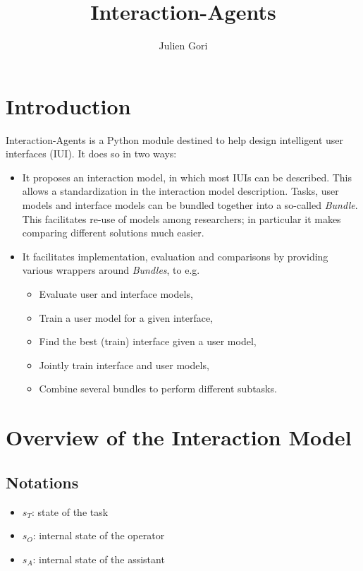 \documentclass[12pt,a4paper]{article}
\title{Interaction-Agents}
\author{Julien Gori}
\begin{document}
\maketitle

\newpage

\tableofcontents

\newpage

\section{Introduction}

Interaction-Agents is a Python module destined to help design intelligent user interfaces (IUI). It does so in two ways:
\begin{itemize}
\item It proposes an interaction model, in which most IUIs can be described. This allows a standardization in the interaction model description. Tasks, user models and interface models can be bundled together into a so-called \emph{Bundle}. This facilitates re-use of models among researchers; in particular it makes comparing different solutions much easier.
\item It facilitates implementation, evaluation and comparisons by providing various wrappers around \emph{Bundles}, to e.g.
	\begin{itemize}
	\item Evaluate user and interface models,
	\item Train a user model for a given interface,
	\item Find the best (train) interface given a user model,
	\item Jointly train interface and user models,
	\item Combine several bundles to perform different subtasks.
	\end{itemize}
\end{itemize}

\section{Overview of the Interaction Model}
\subsection{Notations}
\begin{itemize}
\item $s_T$: state of the task
\item $s_O$: internal state of the operator
\item $s_A$: internal state of the assistant

\end{itemize}
\end{document}
